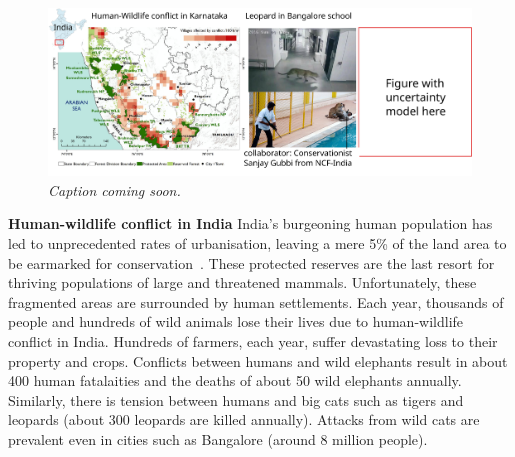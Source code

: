 \documentclass[a4paper,10pt,twocolumn]{article}
\newcommand{\hdg}[1] {\noindent \textbf{#1} }
\begin{document}
{ 
\Large 
{}%
}

\begin{figure}[htbp!]
 \includegraphics[width=\linewidth]{teaser}
\caption{\emph{Caption coming soon.}}
\label{fig:teaser}
\end{figure}

\hdg{Human-wildlife conflict in India} India's burgeoning human population has led to unprecedented rates of urbanisation, leaving a mere 5\% of the land area to be earmarked for conservation~\cite{indiacons}. These protected reserves are the last resort for thriving populations of large and threatened mammals. Unfortunately, these fragmented areas are surrounded by human settlements. Each year, thousands of people and hundreds of wild animals lose their lives due to human-wildlife conflict in India. Hundreds of farmers, each year, suffer devastating loss to their property and crops. Conflicts between humans and wild elephants result in about 400 human fatalaities and the deaths of about 50 wild elephants annually. Similarly, there is tension between humans and big cats such as tigers and leopards (about 300 leopards are killed annually). Attacks from wild cats are prevalent even in cities such as Bangalore (around 8 million people).
\end{document}
